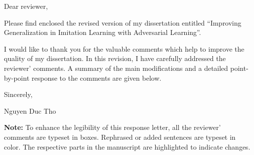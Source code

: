 Dear reviewer,

Please find enclosed the revised version of my dissertation entitled
\enquote{Improving Generalization in Imitation Learning with Adversarial Learning}.

I would like to thank you for the valuable comments which help to improve the quality of my dissertation.
In this revision,
I have carefully addressed the reviewer' comments.
A summary of the main modifications and a detailed point-by-point response to the comments are given below.

\vspace{1.2em}

Sincerely,

\vspace{1.5em}

Nguyen Duc Tho

\vfill

\textbf{Note:}
To enhance the legibility of this response letter,
all the reviewer' comments are typeset in boxes.
Rephrased or added sentences are typeset in color.
The respective parts in the manuscript are highlighted to indicate changes.
